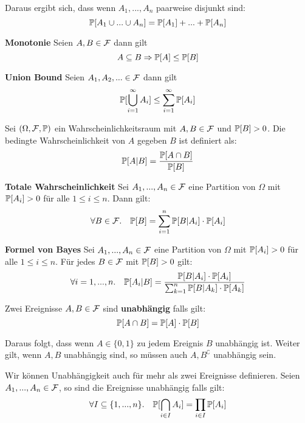 Daraus ergibt sich, dass wenn $A_1, ..., A_n$ paarweise disjunkt sind: 
$$\mathbb{P}[A_1 \cup ... \cup A_n] = \mathbb{P}[A_1] + ... + \mathbb{P}[A_n]$$

\begin{mainbox}{\textbf{Monotonie}}
Seien $A, B \in \mathcal{F}$ dann gilt 
$$A \subseteq B \Rightarrow \mathbb{P}[A] \leq \mathbb{P}[B]$$
\end{mainbox}

\begin{mainbox}{\textbf{Union Bound}} Seien $A_1, A_2, ... \in \mathcal{F}$ dann gilt 
$$\mathbb{P}[\bigcup_{i = 1}^\infty A_i] \leq \sum_{i = 1}^\infty \mathbb{P}[A_i]$$
\end{mainbox}



Sei $(\Omega, \mathcal{F}, \mathbb{P})$ ein Wahrscheinlichkeitsraum mit $A, B \in \mathcal{F}$ und $\mathbb{P}[B] > 0$. Die bedingte Wahrscheinlichkeit von $A$ gegeben $B$ ist definiert als:
$$\mathbb{P}[A | B] = \frac{\mathbb{P}[A \cap B]}{\mathbb{P}[B]}$$

\begin{mainbox}{\textbf{Totale Wahrscheinlichkeit}} Sei $A_1, ..., A_n \in \mathcal{F}$ eine Partition von $\Omega$ mit $\mathbb{P}[A_i] > 0$ für alle $1 \leq i \leq n$. Dann gilt:
$$\forall B \in \mathcal{F}. \quad \mathbb{P}[B] = \sum_{i = 1}^n \mathbb{P}[B | A_i] \cdot \mathbb{P}[A_i]$$
\end{mainbox}

\begin{mainbox}{\textbf{Formel von Bayes}} Sei $A_1, ..., A_n \in \mathcal{F}$ eine Partition von $\Omega$ mit $\mathbb{P}[A_i] > 0$ für alle $1 \leq i \leq n$. Für jedes $B \in \mathcal{F}$ mit $\mathbb{P}[B] > 0$ gilt:
$$\forall i = 1,...,n. \quad \mathbb{P}[A_i | B] = \frac{\mathbb{P}[B | A_i] \cdot \mathbb{P}[A_i]}{\sum_{k = 1}^n \mathbb{P}[B | A_k] \cdot \mathbb{P}[A_k]}$$
\end{mainbox}



\begin{mainbox}{}
    Zwei Ereignisse $A, B \in \mathcal{F}$ sind \textbf{unabhängig} falls gilt:
    $$\mathbb{P}[A \cap B] = \mathbb{P}[A] \cdot \mathbb{P}[B]$$
\end{mainbox}

Daraus folgt, dass wenn $A \in \{0, 1\}$ zu jedem Ereignis $B$ unabhängig ist. Weiter gilt, wenn $A, B$ unabhängig sind, so müssen auch $A, B^\complement$ unabhängig sein. \medskip

Wir können Unabhängigkeit auch für mehr als zwei Ereignisse definieren. Seien $A_1, ..., A_n \in \mathcal{F}$, so sind die Ereignisse unabhängig falls gilt:
$$\forall I \subseteq \{1, ..., n\}. \quad \mathbb{P}[\bigcap_{i \in I} A_i] = \prod_{i \in I} \mathbb{P}[A_i]$$

\columnbreak